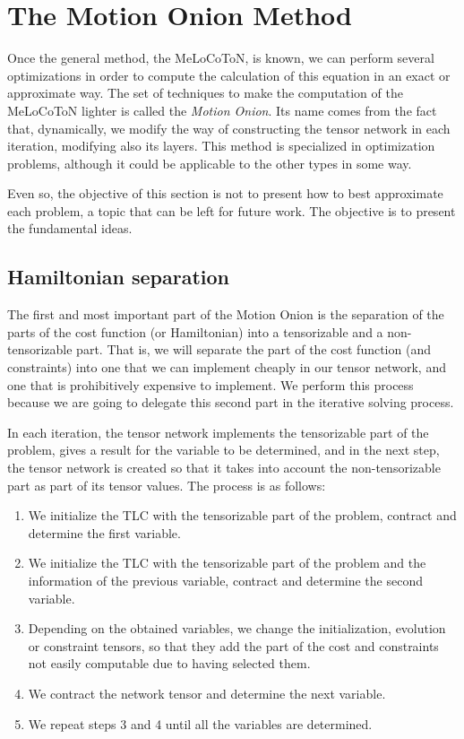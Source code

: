 \section{The Motion Onion Method}
Once the general method, the MeLoCoToN, is known, we can perform several optimizations in order to compute the calculation of this equation  in an exact or approximate way. The set of techniques to make the computation of the MeLoCoToN lighter is called the \textit{Motion Onion}. Its name comes from the fact that, dynamically, we modify the way of constructing the tensor network in each iteration, modifying also its layers. This method is specialized in optimization problems, although it could be applicable to the other types in some way.

Even so, the objective of this section is not to present how to best approximate each problem, a topic that can be left for future work. The objective is to present the fundamental ideas.

\subsection{Hamiltonian separation}
The first and most important part of the Motion Onion is the separation of the parts of the cost function (or Hamiltonian) into a tensorizable and a non-tensorizable part. That is, we will separate the part of the cost function (and constraints) into one that we can implement cheaply in our tensor network, and one that is prohibitively expensive to implement. We perform this process because we are going to delegate this second part in the iterative solving process.

In each iteration, the tensor network implements the tensorizable part of the problem, gives a result for the variable to be determined, and in the next step, the tensor network is created so that it takes into account the non-tensorizable part as part of its tensor values. The process is as follows:

\begin{enumerate}
    \item We initialize the TLC with the tensorizable part of the problem, contract and determine the first variable.
    \item We initialize the TLC with the tensorizable part of the problem and the information of the previous variable, contract and determine the second variable.
    \item Depending on the obtained variables, we change the initialization, evolution or constraint tensors, so that they add the part of the cost and constraints not easily computable due to having selected them.
    \item We contract the network tensor and determine the next variable.
    \item We repeat steps 3 and 4 until all the variables are determined.
\end{enumerate}

